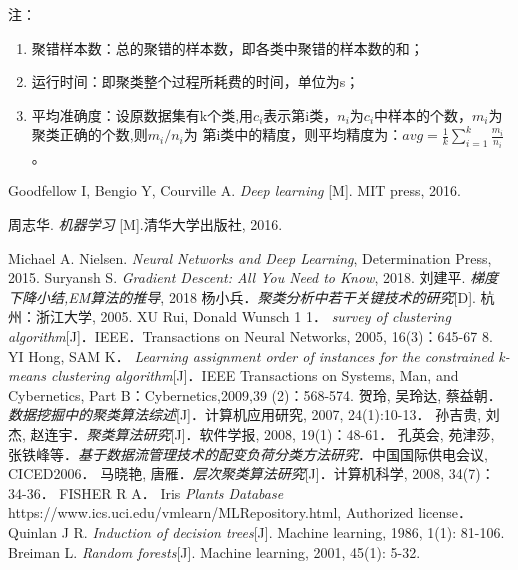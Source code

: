 注：
\begin{enumerate}\itemsep0em
		\item 聚错样本数：总的聚错的样本数，即各类中聚错的样本数的和；
		\item 运行时间：即聚类整个过程所耗费的时间，单位为s；
		\item 平均准确度：设原数据集有k个类,用$c_i$表示第i类，$n_i$为$c_i$中样本的个数，$m_i$为聚类正确的个数,则$m_i/n_i$为 第i类中的精度，则平均精度为：$avg=\frac{1}{k}\sum_{i=1}^{k}\frac{m_{i}}{n_{i}}$。
\end{enumerate}

\begin{thebibliography}{9}

Goodfellow I, Bengio Y, Courville A.
{\it Deep learning}
[M]. MIT press, 2016.

周志华.
{\it 机器学习}
[M].清华大学出版社, 2016.

\bibitem Michael A. Nielsen. {\it Neural Networks and Deep Learning}, Determination Press, 2015.
\bibitem Suryansh S. {\it Gradient Descent: All You Need to Know}, 2018.
\bibitem 刘建平. {\it 梯度下降小结,EM算法的推导}, 2018
\bibitem 杨小兵．{\it 聚类分析中若干关键技术的研究}[D]. 杭州：浙江大学, 2005.
\bibitem XU Rui, Donald Wunsch 1 1． {\it survey of clustering algorithm}[J]．IEEE．Transactions on Neural Networks, 2005, 16(3)：645-67 8.
\bibitem YI Hong, SAM K． {\it Learning assignment order of instances for the constrained k-means clustering algorithm}[J]．IEEE Transactions on Systems, Man, and Cybernetics, Part B：Cybernetics,2009,39 (2)：568-574.
\bibitem 贺玲, 吴玲达, 蔡益朝．{\it 数据挖掘中的聚类算法综述}[J]．计算机应用研究, 2007, 24(1):10-13．
\bibitem 孙吉贵, 刘杰, 赵连宇．{\it 聚类算法研究}[J]．软件学报, 2008, 19(1)：48-61．
\bibitem 孔英会, 苑津莎, 张铁峰等．{\it 基于数据流管理技术的配变负荷分类方法研究}．中国国际供电会议, CICED2006．
\bibitem 马晓艳, 唐雁．{\it 层次聚类算法研究}[J]．计算机科学, 2008, 34(7)：34-36．
\bibitem FISHER R A． Iris {\it Plants Database} https://www.ics.uci.edu/vmlearn/MLRepository.html, Authorized license．
\bibitem Quinlan J R. {\it Induction of decision trees}[J]. Machine learning, 1986, 1(1): 81-106.
\bibitem Breiman L. {\it Random forests}[J]. Machine learning, 2001, 45(1): 5-32.

\end{thebibliography}



